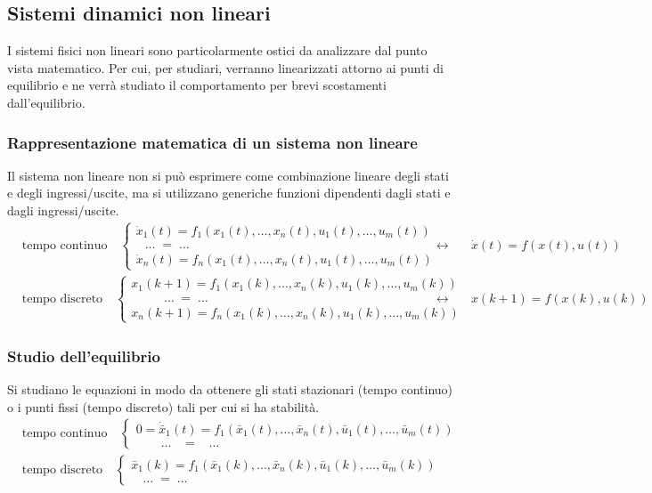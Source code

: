 \subsection{Sistemi dinamici non lineari}
I sistemi fisici non lineari sono particolarmente ostici da analizzare dal punto vista matematico. Per cui, per studiari, verranno
linearizzati attorno ai punti di equilibrio e ne verrà studiato il comportamento per brevi scostamenti dall'equilibrio.

\subsubsection*{Rappresentazione matematica di un sistema non lineare}
Il sistema non lineare non si può esprimere come combinazione lineare degli stati e degli ingressi/uscite, ma si utilizzano generiche
funzioni dipendenti dagli stati e dagli ingressi/uscite.
\begin{align*}
	&\text{tempo continuo} \quad \begin{cases} \dot{x}_1(t) = f_1 (x_1(t), \dots, x_n(t), u_1(t), \dots, u_m(t)) \\ \;\;\, \dots \; = \; \dots \\ \dot{x}_n(t) = f_n (x_1(t), \dots, x_n(t), u_1(t), \dots, u_m(t)) \end{cases} &\leftrightarrow \quad &\dot{x}(t) = f(x(t),u(t)) \\
	&\text{tempo discreto} \quad \begin{cases} x_1(k+1) = f_1 (x_1(k), \dots, x_n(k), u_1(k), \dots, u_m(k)) \\ \qquad\;\,\, \dots \; = \; \dots \\ x_n(k+1) = f_n (x_1(k), \dots, x_n(k), u_1(k), \dots, u_m(k)) \end{cases} &\leftrightarrow \quad &x(k+1) = f(x(k),u(k))
\end{align*}

\subsubsection*{Studio dell'equilibrio}
Si studiano le equazioni in modo da ottenere gli stati stazionari (tempo continuo) o i punti fissi (tempo discreto) tali per cui
si ha stabilità.
\begin{align*}
	&\text{tempo continuo} \quad \begin{cases} 0 = \dot{\bar{x}}_1(t) = f_1 (\bar{x}_1(t), \dots, \bar{x}_n(t), \bar{u}_1(t), \dots, \bar{u}_m(t)) \\ \qquad \dots \;\;\; = \;\;\; \dots \end{cases} \\
	&\text{tempo discreto} \quad \begin{cases} \bar{x}_1(k) = f_1 (\bar{x}_1(k), \dots, \bar{x}_n(k), \bar{u}_1(k), \dots, \bar{u}_m(k)) \\ \;\;\:\, \dots \; = \; \dots  \end{cases}
\end{align*}

